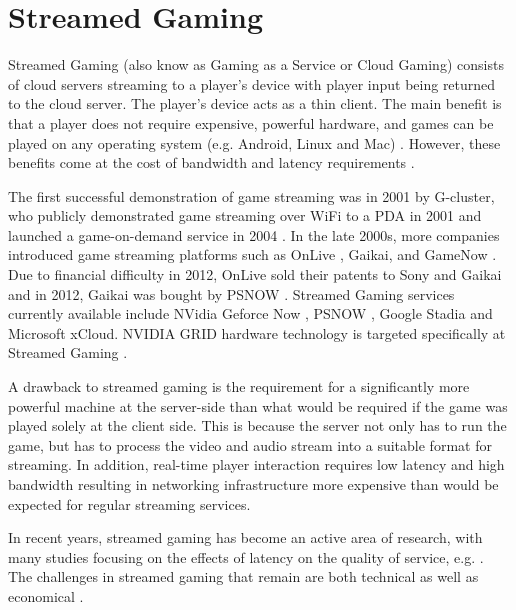 \section{Streamed Gaming}

Streamed Gaming (also know as Gaming as a Service or Cloud Gaming) consists of cloud servers streaming to a player's device with player input being returned to the cloud server. The player's device acts as a thin client. The main benefit is that a player does not require expensive, powerful hardware, and games can be played on any operating system (e.g. Android, Linux and Mac) \cite{D_Angelo_2015}. However, these benefits come at the cost of bandwidth and latency requirements \cite{iCloudAccess}.

The first successful demonstration of game streaming was in 2001 by G-cluster, who publicly demonstrated game streaming over WiFi to a PDA in 2001 and launched a game-on-demand service in 2004 \cite{2016SurveyOnCloudGaming}. In the late 2000s, more companies introduced game streaming platforms such as OnLive \cite{OnLive}, Gaikai, and GameNow \cite{GameNow}. Due to financial difficulty in 2012, OnLive sold their patents to Sony and Gaikai and in 2012, Gaikai was bought by PSNOW \cite{PSNOW}.
Streamed Gaming services currently available include NVidia Geforce Now \cite{NVidiaGameStream}, PSNOW \cite{PSNOW}, Google Stadia\cite{Stadia} and Microsoft xCloud\cite{xCloud}. NVIDIA GRID hardware technology is targeted specifically at Streamed Gaming \cite{NVIDIACloud}.

A drawback to streamed gaming is the requirement for a significantly more powerful machine at the server-side than what would be required if the game was played solely at the client side. This is because the server not only has to run the game, but has to process the video and audio stream into a suitable format for streaming. In addition, real-time player interaction requires low latency and high bandwidth resulting in networking infrastructure more expensive than would be expected for regular streaming services. 

In recent years, streamed gaming has become an active area of research, with many studies focusing on the effects of latency on the quality of service, e.g. \cite{CloudGamingArchPerf, chen2011measuring, jarschel2011evaluation, lee2012all, StormInCloudGaming, chen2013quality}. The challenges in streamed gaming that remain are both technical as well as economical \cite{2016SurveyOnCloudGaming}.

